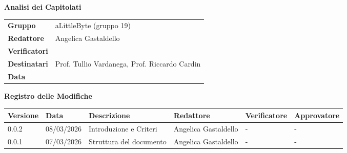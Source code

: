 \documentclass[a4paper,12pt]{article}
\begin{document}
\thispagestyle{firstpage}

\vspace*{0.5cm}

\begin{center}
    {\LARGE \textbf{Analisi dei Capitolati}}
\end{center}

\vspace{1.5cm}

\begin{center}
    \renewcommand{\arraystretch}{1.3}
    \begin{tcolorbox}[
        width=0.92\textwidth,
        colback=gray!6,
        colframe=gray!45,
        boxrule=0.5pt,
        arc=2mm,
        boxsep=0pt,
        left=8pt, right=8pt, top=8pt, bottom=8pt
    ]
        \begin{tabularx}{\linewidth}{>{\bfseries}p{3.5cm} X}
            Gruppo      & aLittleByte (gruppo 19) \\
            Redattore   & Angelica Gastaldello \\
            Verificatori& \\
            Destinatari & Prof. Tullio Vardanega, Prof. Riccardo Cardin \\
            Data        & \\
        \end{tabularx}
    \end{tcolorbox}
\end{center}

\newpage


\begin{center}
    {\Large \textbf{Registro delle Modifiche}}
\end{center}

\vspace{0.35cm}

\renewcommand{\arraystretch}{1.35}
\begin{center}
    {\footnotesize
    \begin{tabularx}{\textwidth}{|p{1.8cm}|p{2.1cm}|X|p{2.4cm}|p{2.4cm}|p{2.4cm}|}
        \hline
        \rowcolor{gray!20}
        \textbf{Versione} & \textbf{Data} & \textbf{Descrizione} & \textbf{Redattore} & \textbf{Verificatore} & \textbf{Approvatore} \\
        \hline
        0.0.2 & 08/03/2026 & Introduzione e Criteri & Angelica Gastaldello & - & - \\
        \hline
        0.0.1 & 07/03/2026 & Struttura del documento & Angelica Gastaldello & - & - \\
        \hline
    \end{tabularx}
    }
\end{center}
\end{document}
